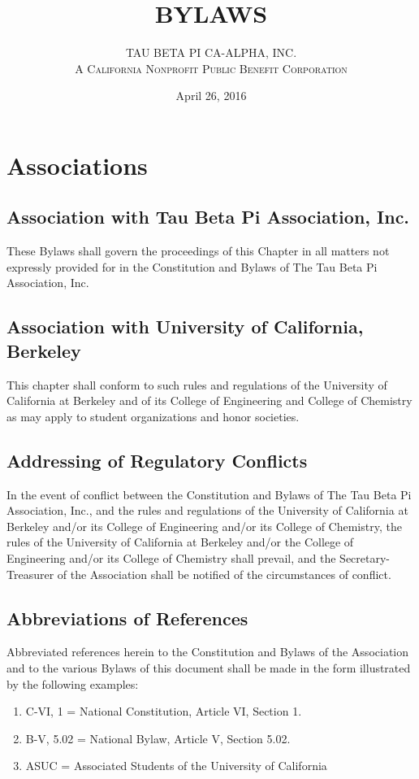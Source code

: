 \documentclass{article}
\begin{document}
	\title{\textbf {\uppercase{Bylaws}}}
	\author{\uppercase{Tau Beta Pi CA-Alpha, Inc.} \\ \textsc{A California Nonprofit Public Benefit Corporation}}
	\date{April 26, 2016}
	\maketitle
	\clearpage


	\section{Associations}
	\subsection{Association with Tau Beta Pi Association, Inc.}
	These Bylaws shall govern the proceedings of this Chapter in all matters not expressly provided for in the Constitution and Bylaws of The Tau Beta Pi Association, Inc.
	\subsection{Association with University of California, Berkeley}
	This chapter shall conform to such rules and regulations of the University of California at Berkeley and of its College of Engineering and College of Chemistry as may apply to student organizations and honor societies.
	\subsection{Addressing of Regulatory Conflicts}
	In the event of conflict between the Constitution and Bylaws of The Tau Beta Pi Association, Inc., and the rules and regulations of the University of California at Berkeley and/or its College of Engineering and/or its College of Chemistry, the rules of the University of California at Berkeley and/or the College of Engineering and/or its College of Chemistry shall prevail, and the Secretary- Treasurer of the Association shall be notified of the circumstances of conflict.
	\subsection{Abbreviations of References}
	Abbreviated references herein to the Constitution and Bylaws of the Association and to the various Bylaws of this document shall be made in the form illustrated by the following examples:
	\begin{enumerate}[\indent a)]
	\item C-VI, 1 = National Constitution, Article VI, Section 1. 
	\item B-V, 5.02 = National Bylaw, Article V, Section 5.02.
	\item ASUC = Associated Students of the University of California 
	\end{enumerate}
	
\end{document}
